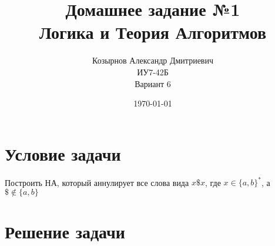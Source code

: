 

\title{Домашнее задание №1\\ Логика и Теория Алгоритмов}
\author{Козырнов Александр Дмитриевич\\ ИУ7-42Б\\Вариант 6}
\date{\today}


\maketitle
\tableofcontents
\newpage

\section{Условие задачи}
Построить НА, который аннулирует все слова вида $x\$x$, где
$x \in \{a,b\}^{*}$, а $\$ \not\in \{a,b\} $

\section{Решение задачи}


